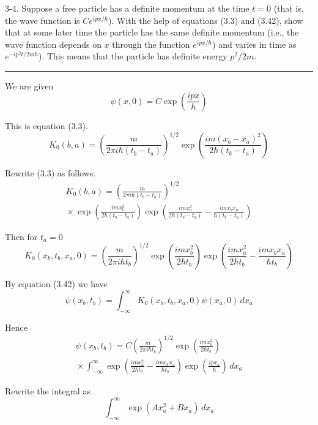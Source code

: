 \documentclass[12pt]{article}
\begin{document}
3-4.
Suppose a free particle has a definite momentum at the
time $t=0$ (that is, the wave function is $Ce^{ipx/\hbar}$).
With the help of equations (3.3) and (3.42),
show that at some later time the particle has the same
definite momentum
(i.e., the wave function depends on $x$ through the
function $e^{ipx/\hbar}$)
and varies in time as
$e^{-ip^2t/2m\hbar}$).
This means that the particle has definite energy $p^2/2m$.

\bigskip
\hrule

\bigskip
We are given
\begin{equation*}
\psi(x,0)=C\exp\left(\frac{ipx}{\hbar}\right)
\end{equation*}

\noindent
This is equation (3.3).
\begin{equation*}
K_0(b,a)=\left(\frac{m}{2\pi i\hbar(t_b-t_a)}\right)^{1/2}
\exp\left(\frac{im(x_b-x_a)^2}{2\hbar(t_b-t_a)}\right)
\tag{3.3}
\end{equation*}

Rewrite (3.3) as follows.
\begin{multline*}
K_0(b,a)=\left(\frac{m}{2\pi i\hbar(t_b-t_a)}\right)^{1/2}
\\
{}\times\exp\left(\frac{imx_b^2}{2\hbar(t_b-t_a)}\right)
\exp\left(\frac{imx_a^2}{2\hbar(t_b-t_a)}-\frac{imx_bx_a}{\hbar(t_b-t_a)}\right)
\end{multline*}

Then for $t_a=0$
\begin{equation*}
K_0(x_b,t_b,x_a,0)=\left(\frac{m}{2\pi i\hbar t_b}\right)^{1/2}
\exp\left(\frac{imx_b^2}{2\hbar t_b}\right)
\exp\left(\frac{imx_a^2}{2\hbar t_b}-\frac{imx_bx_a}{\hbar t_b}\right)
\end{equation*}

By equation (3.42) we have
\begin{equation*}
\psi(x_b,t_b)=\int_{-\infty}^\infty K_0(x_b,t_b,x_a,0)\psi(x_a,0)\,dx_a
\end{equation*}

Hence
\begin{multline*}
\psi(x_b,t_b)=C\left(\frac{m}{2\pi i\hbar t_b}\right)^{1/2}
\exp\left(\frac{imx_b^2}{2\hbar t_b}\right)
\\
{}\times\int_{-\infty}^\infty
\exp\left(\frac{imx_a^2}{2\hbar t_b}-\frac{imx_bx_a}{\hbar t_b}\right)
\exp\left(\frac{ipx_a}{\hbar}\right)\,dx_a
\tag{1}
\end{multline*}

Rewrite the integral as
\begin{equation*}
\int_{-\infty}^\infty\exp(Ax_a^2+Bx_a)\,dx_a
\end{equation*}
\end{document}
